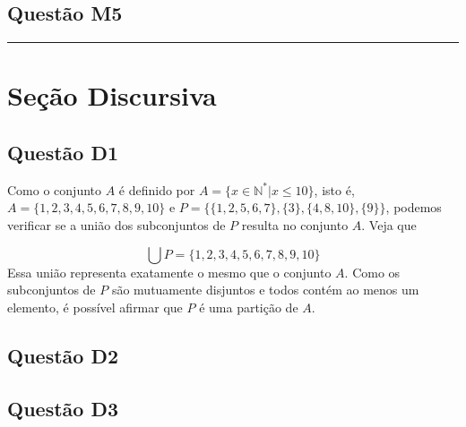 \documentclass{article}
\begin{document}
\subsection{Questão M5}

\vspace{0.5em}
\hrule
\vspace{0.5em}

\section{Seção Discursiva}

\subsection{Questão D1}
Como o conjunto $A$ é definido por $A = \{ x \in \mathbb{N^*} | x \leq 10 \}$, isto é,
$A = \{1, 2, 3, 4, 5, 6, 7, 8, 9, 10\}$ e $P = \{\{1,2,5,6,7\},\{3\}, \{4, 8, 10\}, \{9\}\}$, podemos verificar se a união dos subconjuntos de $P$ resulta no conjunto $A$. Veja que

\[
\bigcup P = \{1, 2, 3, 4, 5, 6, 7, 8, 9, 10\}
\]
Essa união representa exatamente o mesmo que o conjunto $A$. Como os subconjuntos de $P$ são mutuamente disjuntos e todos contém ao menos um elemento, é possível afirmar que $P$ é uma partição de $A$.
\subsection{Questão D2}
\subsection{Questão D3}
\end{document}

